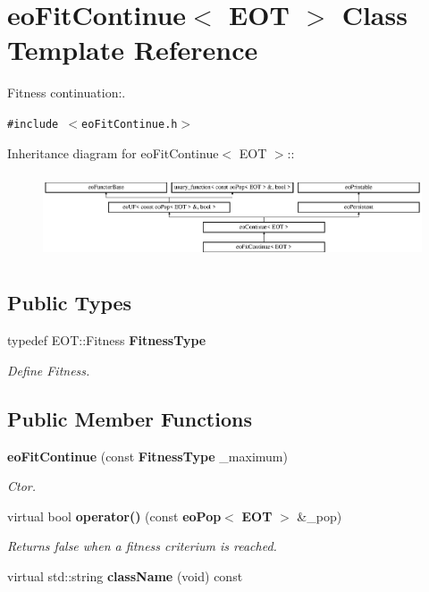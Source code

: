 \section{eo\-Fit\-Continue$<$ EOT $>$ Class Template Reference}
\label{classeo_fit_continue}
Fitness continuation:.  


{\tt \#include $<$eo\-Fit\-Continue.h$>$}

Inheritance diagram for eo\-Fit\-Continue$<$ EOT $>$::\begin{figure}[H]
\begin{center}
\leavevmode
\includegraphics[height=2.52252cm]{classeo_fit_continue}
\end{center}
\end{figure}
\subsection*{Public Types}
\begin{CompactItemize}
\item 
typedef EOT::Fitness {\bf Fitness\-Type}\label{classeo_fit_continue_w0}

\begin{CompactList}\small\item\em Define Fitness. \item\end{CompactList}\end{CompactItemize}
\subsection*{Public Member Functions}
\begin{CompactItemize}
\item 
{\bf eo\-Fit\-Continue} (const {\bf Fitness\-Type} \_\-maximum)\label{classeo_fit_continue_a0}

\begin{CompactList}\small\item\em Ctor. \item\end{CompactList}\item 
virtual bool {\bf operator()} (const {\bf eo\-Pop}$<$ {\bf EOT} $>$ \&\_\-pop)
\begin{CompactList}\small\item\em Returns false when a fitness criterium is reached. \item\end{CompactList}\item 
virtual std::string {\bf class\-Name} (void) const \label{classeo_fit_continue_a2}

\end{CompactItemize}
